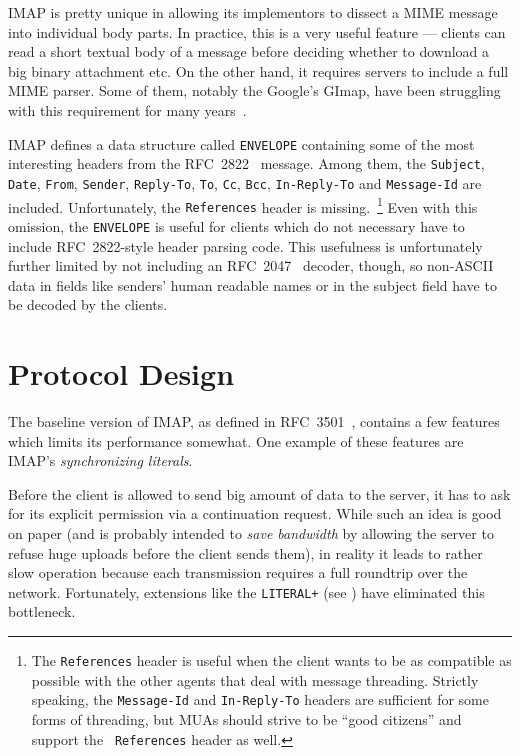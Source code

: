 \documentclass[trojita]{subfiles}
\begin{document}
IMAP is pretty unique in allowing its implementors to dissect a MIME message~\cite{rfc2045} into individual body parts.
In practice, this is a very useful feature --- clients can read a short textual body of a message before deciding whether
to download a big binary attachment etc.  On the other hand, it requires servers to include a full MIME parser.  Some of
them, notably the Google's GImap, have been struggling with this requirement for many
years~\cite{gmail-bodystructure-sucks}.

IMAP defines a data structure called {\tt ENVELOPE} containing some of the most interesting headers from the
RFC~2822~\cite{rfc2822} message.  Among them, the {\tt Subject}, {\tt Date}, {\tt From}, {\tt Sender}, {\tt Reply-To},
{\tt To}, {\tt Cc}, {\tt Bcc}, {\tt In-Reply-To} and {\tt Message-Id} are included.  Unfortunately, the {\tt References}
header is missing.~\footnote{The {\tt References} header is useful when the client wants to be as compatible as possible
with the other agents that deal with message threading.  Strictly speaking, the {\tt Message-Id} and {\tt In-Reply-To}
headers are sufficient for some forms of threading, but MUAs should strive to be ``good citizens'' and support the {\tt
References} header as well.}  Even with this omission, the {\tt ENVELOPE} is useful for clients which do not necessary
have to include RFC~2822-style header parsing code.  This usefulness is unfortunately further limited by not including
an RFC~2047~\cite{rfc2047} decoder, though, so non-ASCII data in fields like senders' human readable names or in the
subject field have to be decoded by the clients.

\section{Protocol Design}

The baseline version of IMAP, as defined in RFC~3501~\cite{rfc3501}, contains a few features which limits its
performance somewhat.  One example of these features are IMAP's {\em synchronizing literals}.

Before the client is allowed to send big amount of data to the server, it has to ask for its explicit permission via a
continuation request.  While such an idea is good on paper (and is probably intended to {\em save bandwidth} by allowing
the server to refuse huge uploads before the client sends them), in reality it leads to rather slow operation because
each transmission requires a full roundtrip over the network.  Fortunately, extensions like the {\tt LITERAL+} (see
) have eliminated this bottleneck.
\end{document}
